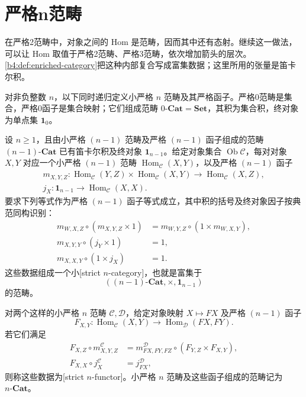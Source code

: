 
\section{严格n范畴}
\label{b4:sec:F03}

在严格2范畴中，对象之间的 Hom 是范畴，因而其中还有态射。继续这一做法，可以让 Hom 取值于严格2范畴、严格3范畴，依次增加箭头的层次。\cref{b4:def:enriched-category}把这种内部复合写成富集数据；这里所用的张量是笛卡尔积。

\begin{definition}\label{b4:def:F-strict-n-category}
	对非负整数 \(n\)，以下同时递归定义小严格 \(n\) 范畴及其严格函子。严格0范畴是集合，严格0函子是集合映射；它们组成范畴 \(0\text{-}\mathbf{Cat}=\mathbf{Set}\)，其积为集合积，终对象为单点集 \(\mathbf1_0\)。

	设 \(n\ge1\)，且由小严格 \((n-1)\) 范畴及严格 \((n-1)\) 函子组成的范畴 \((n-1)\text{-}\mathbf{Cat}\) 已有笛卡尔积及终对象 \(\mathbf1_{n-1}\)。给定对象集合 \(\operatorname{Ob}\mathcal C\)，每对对象 \(X,Y\) 对应一个小严格 \((n-1)\) 范畴 \(\operatorname{Hom}_{\mathcal C}(X,Y)\)，以及严格 \((n-1)\) 函子
	\[
		\begin{gathered}
			m_{X,Y,Z}:\operatorname{Hom}_{\mathcal C}(Y,Z) \times\operatorname{Hom}_{\mathcal C}(X,Y) \longrightarrow\operatorname{Hom}_{\mathcal C}(X,Z),\\
			j_X:\mathbf1_{n-1}\longrightarrow\operatorname{Hom}_{\mathcal C}(X,X).
		\end{gathered}
	\]
	要求下列等式作为严格 \((n-1)\) 函子等式成立，其中积的括号及终对象因子按典范同构识别：
	\[
		\begin{aligned}
			m_{W,X,Z}\circ(m_{X,Y,Z}\times1) &=m_{W,Y,Z}\circ(1\times m_{W,X,Y}),\\
			m_{X,Y,Y}\circ(j_Y\times1)&=1,\\
			m_{X,X,Y}\circ(1\times j_X)&=1.
		\end{aligned}
	\]
	这些数据组成一个小[strict \(n\)-category]，也就是富集于
	\[
		((n-1)\text{-}\mathbf{Cat},\times,\mathbf1_{n-1})
	\]
	的范畴。

	对两个这样的小严格 \(n\) 范畴 \(\mathcal C,\mathcal D\)，给定对象映射 \(X\mapsto FX\) 及严格 \((n-1)\) 函子
	\[
		F_{X,Y}:\operatorname{Hom}_{\mathcal C}(X,Y) \longrightarrow\operatorname{Hom}_{\mathcal D}(FX,FY).
	\]
	若它们满足
	\[
		\begin{aligned}
			F_{X,Z}\circ m^{\mathcal C}_{X,Y,Z} &=m^{\mathcal D}_{FX,FY,FZ}\circ(F_{Y,Z}\times F_{X,Y}),\\
			F_{X,X}\circ j^{\mathcal C}_X&=j^{\mathcal D}_{FX},
		\end{aligned}
	\]
	则称这些数据为[strict \(n\)-functor]。小严格 \(n\) 范畴及这些函子组成的范畴记为 \(n\text{-}\mathbf{Cat}\)。
\end{definition}

